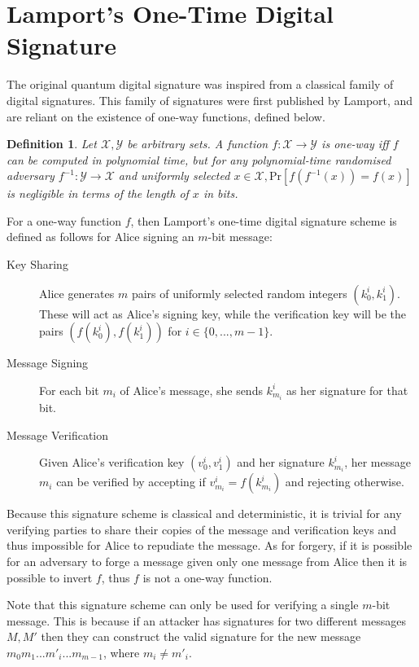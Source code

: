 \documentclass[%
 reprint,
 amsmath,amssymb,
 aps,
 pra,
]{revtex4-1}
\newtheorem{definition}{Definition}[section]
\begin{document}
\section{Lamport's One-Time Digital Signature}

The original quantum digital signature was inspired from a classical family of digital signatures. This family of signatures were first published by Lamport\cite{lamp79}, and are reliant on the existence of one-way functions, defined below.

\begin{definition}
Let $\mathcal{X}, \mathcal{Y}$ be arbitrary sets. A function $f:\mathcal{X} \rightarrow \mathcal{Y}$ is one-way iff $f$ can be computed in polynomial time, but for any polynomial-time randomised adversary $f^{-1}:\mathcal{Y} \rightarrow \mathcal{X}$ and uniformly selected $x \in \mathcal{X}, \mathrm{Pr}[f(f^{-1}(x)) = f(x)]$ is negligible in terms of the length of $x$ in bits.
\end{definition}

For a one-way function $f$, then Lamport's one-time digital signature scheme is defined as follows for Alice signing an $m$-bit message:

\begin{description}
\item[Key Sharing]Alice generates $m$ pairs of uniformly selected random integers $(k^i_0, k^i_1)$. These will act as Alice's signing key, while the verification key will be the pairs $(f(k^i_0), f(k^i_1))$ for $i \in \{0,...,m-1\}$.
\item[Message Signing]For each bit $m_i$ of Alice's message, she sends $k^i_{m_i}$ as her signature for that bit.
\item[Message Verification]Given Alice's verification key $(v^i_0, v^i_1)$ and her signature $k^i_{m_i}$, her message $m_i$ can be verified by accepting if $v^i_{m_i} = f(k^i_{m_i})$ and rejecting otherwise.
\end{description}

Because this signature scheme is classical and deterministic, it is trivial for any verifying parties to share their copies of the message and verification keys and thus impossible for Alice to repudiate the message. As for forgery, if it is possible for an adversary to forge a message given only one message from Alice then it is possible to invert $f$, thus $f$ is not a one-way function.

Note that this signature scheme can only be used for verifying a single $m$-bit message. This is because if an attacker has signatures for two different messages $M, M'$ then they can construct the valid signature for the new message $m_0m_1...m'_i...m_{m-1}$, where $m_i \neq m'_i$.
\end{document}

